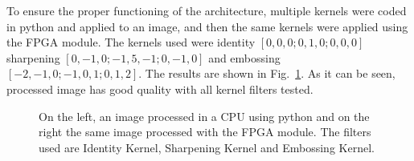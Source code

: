 \documentclass[conference,compsoc]{IEEEtran}
\begin{document}
To ensure the proper functioning of the architecture, multiple kernels were
coded in python and applied to an image, and then the same kernels were applied
using the FPGA module. The kernels used were identity $[0, 0, 0; 0, 1, 0; 0, 0,
0]$ sharpening $[0, -1, 0; -1, 5, -1; 0, -1, 0]$ and embossing $[-2, -1, 0; -1,
0, 1; 0, 1, 2]$. The results are shown in Fig.~\ref{images_py_po}. As it can be
seen, processed image has good quality with all kernel filters tested.


\begin{figure}[!t]
\centering
{}
\hfil
{}
\hfil
{}
\caption{On the left, an image processed in a CPU using python and on the right the
  same image processed with the FPGA module. The filters used are \protect{}
  Identity Kernel, \protect{} Sharpening Kernel and \protect{} Embossing Kernel.}
\label{images_py_po}
\end{figure}
\end{document}
